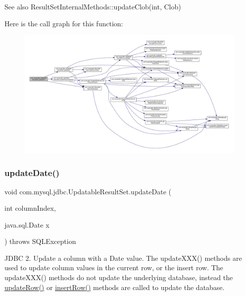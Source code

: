\begin{DoxySeeAlso}{See also}
Result\+Set\+Internal\+Methods\+::update\+Clob(int, Clob) 
\end{DoxySeeAlso}
Here is the call graph for this function\+:
\nopagebreak
\begin{figure}[H]
\begin{center}
\leavevmode
\includegraphics[width=350pt]{classcom_1_1mysql_1_1jdbc_1_1_updatable_result_set_adc60deda2d478d5978e684d6efc77e4b_cgraph}
\end{center}
\end{figure}
\mbox{\label{classcom_1_1mysql_1_1jdbc_1_1_updatable_result_set_aafe2454bd0a1a422df6e0165f4828e87}} 
\subsubsection{\texorpdfstring{update\+Date()}{updateDate()}\hspace{0.1cm}{\footnotesize\ttfamily [1/2]}}
{\footnotesize\ttfamily void com.\+mysql.\+jdbc.\+Updatable\+Result\+Set.\+update\+Date (\begin{DoxyParamCaption}\item[{int}]{column\+Index,  }\item[{java.\+sql.\+Date}]{x }\end{DoxyParamCaption}) throws S\+Q\+L\+Exception}

J\+D\+BC 2. Update a column with a Date value. The update\+X\+X\+X() methods are used to update column values in the current row, or the insert row. The update\+X\+X\+X() methods do not update the underlying database, instead the \mbox{\hyperlink{classcom_1_1mysql_1_1jdbc_1_1_updatable_result_set_a919969ba4b3c7cbc7b18605e9f31a746}{update\+Row()}} or \mbox{\hyperlink{classcom_1_1mysql_1_1jdbc_1_1_updatable_result_set_aef041f8d9d0778083716fc26652648fa}{insert\+Row()}} methods are called to update the database.


